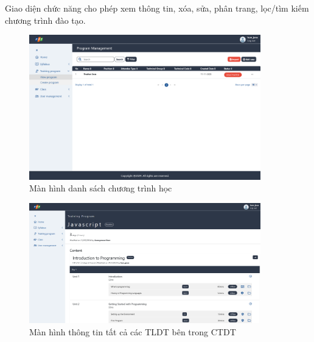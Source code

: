 \documentclass[report.tex]{subfiles}
\begin{document}
Giao diện chức năng cho phép xem thông tin, xóa, sửa, phân trang, lọc/tìm kiếm chương trình đào tạo.

\begin{figure}[!htb]
{\centering
\includegraphics[width=380px]{../meta/ui.program-list.png}
\caption{Màn hình danh sách chương trình học}
\par
}
\end{figure}
\FloatBarrier

\begin{figure}[!htb]
{\centering
\includegraphics[width=380px]{../meta/ui.program-detail.png}
\caption[Màn hình thông tin CTDT]{Màn hình thông tin tất cả các TLDT bên trong CTDT}
\par
}
\end{figure}
\FloatBarrier
\end{document}
